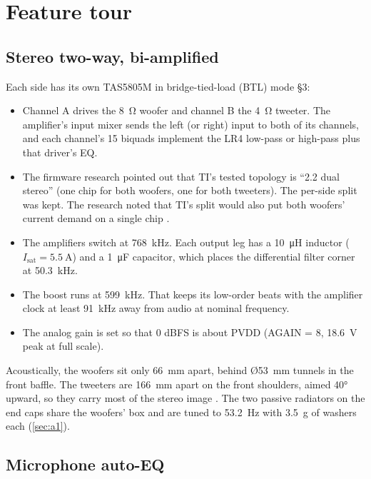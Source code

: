 \section{Feature tour}\label{sec:features}

\subsection{Stereo two-way, bi-amplified}

Each side has its own TAS5805M in bridge-tied-load (BTL) mode  §3:
\begin{itemize}
  \item Channel A drives the \qty{8}{\ohm} woofer and channel B the \qty{4}{\ohm} tweeter. The amplifier's input mixer sends the left (or right) input to both of its channels, and each channel's 15 biquads implement the LR4 low-pass or high-pass plus that driver's EQ.
  \item The firmware research pointed out that TI's tested topology is ``2.2 dual stereo'' (one chip for both woofers, one for both tweeters). The per-side split was kept. The research noted that TI's split would also put both woofers' current demand on a single chip .
  \item The amplifiers switch at \qty{768}{\kilo\hertz}. Each output leg has a \qty{10}{\micro\henry} inductor ($I_\text{sat}=\qty{5.5}{\ampere}$) and a \qty{1}{\micro\farad} capacitor, which places the differential filter corner at \qty{50.3}{\kilo\hertz}.
  \item The boost runs at \qty{599}{\kilo\hertz}. That keeps its low-order beats with the amplifier clock at least \qty{91}{\kilo\hertz} away from audio at nominal frequency.
  \item The analog gain is set so that 0 dBFS is about PVDD (AGAIN = 8, \qty{18.6}{\volt} peak at full scale).
\end{itemize}

Acoustically, the woofers sit only \qty{66}{\milli\metre} apart, behind Ø\qty{53}{\milli\metre} tunnels in the front baffle. The tweeters are \qty{166}{\milli\metre} apart on the front shoulders, aimed \ang{40} upward, so they carry most of the stereo image . The two passive radiators on the end caps share the woofers' box and are tuned to \qty{53.2}{\hertz} with \qty{3.5}{\gram} of washers each (\cref{sec:a1}).

\subsection{Microphone auto-EQ}

